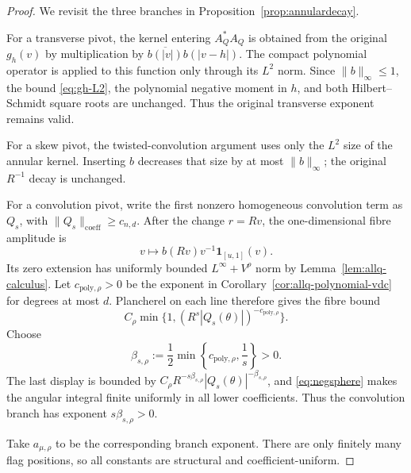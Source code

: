 \documentclass[11pt]{article}
\numberwithin{equation}{section}
\theoremstyle{remark}
\theoremstyle{definition}
\begin{document}
\begin{proof}
We revisit the three branches in Proposition~\ref{prop:annulardecay}.

For a transverse pivot, the kernel entering $A_Q^*A_Q$ is obtained from
the original $g_h(v)$ by multiplication by
$\overline{b(|v|)}b(|v-h|)$. The compact polynomial operator is applied
to this function only through its $L^2$ norm. Since
$\|b\|_\infty\le1$, the bound \eqref{eq:gh-L2}, the polynomial negative
moment in $h$, and both Hilbert--Schmidt square roots are unchanged.
Thus the original transverse exponent remains valid.

For a skew pivot, the twisted-convolution argument uses only the $L^2$
size of the annular kernel. Inserting $b$ decreases that size by at most
$\|b\|_\infty$; the original $R^{-1}$ decay is unchanged.

For a convolution pivot, write the first nonzero homogeneous convolution
term as $Q_s$, with
$\|Q_s\|_{\mathrm{coeff}}\ge c_{n,d}$. After the change $r=Rv$, the
one-dimensional fibre amplitude is
\[
 v\longmapsto b(Rv)v^{-1}\mathbf1_{[u,1]}(v).
\]
Its zero extension has uniformly bounded $L^\infty+V^\rho$ norm by
Lemma~\ref{lem:allq-calculus}. Let
$c_{\mathrm{poly},\rho}>0$ be the exponent in
Corollary~\ref{cor:allq-polynomial-vdc} for degrees at most $d$. Plancherel
on each line therefore gives the fibre bound
\[
 C_\rho\min\{1,(R^s|Q_s(\theta)|)^{-c_{\mathrm{poly},\rho}}\}.
\]
Choose
\begin{equation}\label{eq:allq-convolution-annular-beta}
 \beta_{s,\rho}
 :=\frac12\min\left\{c_{\mathrm{poly},\rho},\frac1s\right\}>0.
\end{equation}
The last display is bounded by
$C_\rho R^{-s\beta_{s,\rho}}|Q_s(\theta)|^{-\beta_{s,\rho}}$, and
\eqref{eq:negsphere} makes the angular integral finite uniformly in all
lower coefficients. Thus the convolution branch has exponent
$s\beta_{s,\rho}>0$.

Take $a_{\mu,\rho}$ to be the corresponding branch exponent. There are
only finitely many flag positions, so all constants are structural and
coefficient-uniform.
\end{proof}
\end{document}
